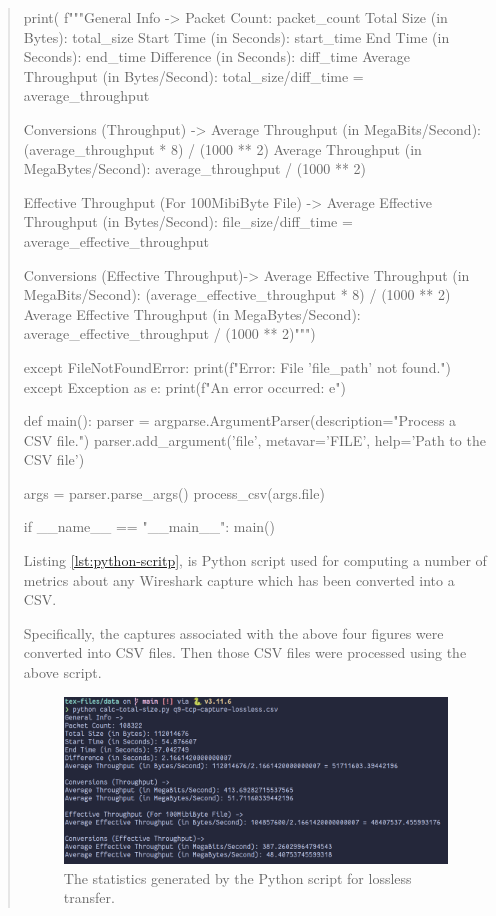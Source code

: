 \documentclass{article}
\newenvironment{ans}
{\fbox{Answer}\begin{quote}\nopagebreak}
{\end{quote}}
\begin{document}
\begin{ans}
\begin{gruvboxlisting}[language=Python,caption={A Python script for computing a
number of statistics about any Wireshark capture.},label={lst:python-scritp}]
print( f"""General Info -> Packet Count: {packet_count}
Total Size (in Bytes): {total_size} Start Time (in
Seconds): {start_time} End Time (in Seconds): {end_time}
Difference (in Seconds): {diff_time} Average Throughput (in
Bytes/Second): {total_size}/{diff_time} =
{average_throughput}

Conversions (Throughput) -> Average Throughput (in
MegaBits/Second): {(average_throughput * 8) / (1000 ** 2)}
Average Throughput (in MegaBytes/Second):
{average_throughput / (1000 ** 2)}

Effective Throughput (For 100MibiByte File) -> Average
Effective Throughput (in Bytes/Second):
{file_size}/{diff_time} = {average_effective_throughput}

Conversions (Effective Throughput)-> Average Effective
Throughput (in MegaBits/Second):
{(average_effective_throughput * 8) / (1000 ** 2)} Average
Effective Throughput (in MegaBytes/Second):
{average_effective_throughput / (1000 ** 2)}""")

except FileNotFoundError: print(f"Error: File '{file_path}'
not found.") except Exception as e: print(f"An error
occurred: {e}")

def main(): parser =
argparse.ArgumentParser(description="Process a CSV file.")
parser.add_argument('file', metavar='FILE', help='Path to
the CSV file')

args = parser.parse_args() process_csv(args.file)

if __name__ == "__main__": main()
\end{gruvboxlisting}

Listing \ref{lst:python-scritp}, is Python script used for
computing a number of metrics about any Wireshark capture
which has been converted into a CSV.

Specifically, the captures associated with the above four
figures were converted into CSV files. Then those CSV files
were processed using the above script.

\begin{figure}[H]
\centering
\includegraphics[width=16cm]{data/q9-stats-tcp-lossless.png}
\caption{The statistics generated by the Python script for lossless transfer.}
\end{figure}


\end{ans}
\end{document}
